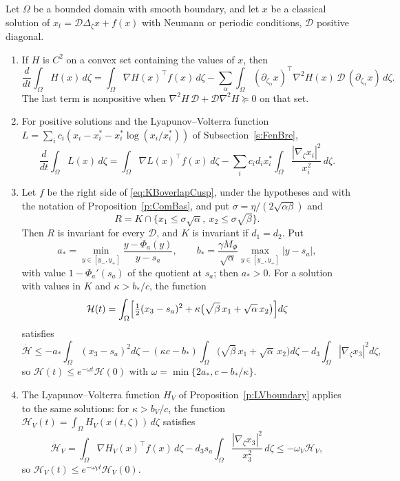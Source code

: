 Let $\Omega$ be a bounded domain with smooth boundary, and let $x$ be a classical solution of $x_t=\mathcal D\Delta_\zeta x+f(x)$ with Neumann or periodic conditions, $\mathcal D$ positive diagonal.
\begin{enumerate}
\item If $H$ is $C^2$ on a convex set containing the values of $x$, then
\[
 \frac{d}{dt}\int_\Omega H(x)\,d\zeta=\int_\Omega\nabla H(x)^\top f(x)\,d\zeta-\sum_\alpha\int_\Omega(\partial_{\zeta_\alpha}x)^\top\nabla^2H(x)\,\mathcal D\,(\partial_{\zeta_\alpha}x)\,d\zeta.
\]
The last term is nonpositive when $\nabla^2H\,\mathcal D+\mathcal D\nabla^2H\succeq0$ on that set.
\item For positive solutions and the Lyapunov--Volterra function $L=\sum_ic_i(x_i-x_i^*-x_i^*\log(x_i/x_i^*))$ of Subsection~\ref{s:FenBre},
\[
 \frac{d}{dt}\int_\Omega L(x)\,d\zeta=\int_\Omega\nabla L(x)^\top f(x)\,d\zeta-\sum_ic_id_ix_i^*\int_\Omega\frac{|\nabla_\zeta x_i|^2}{x_i^2}\,d\zeta.
\]
\item Let $f$ be the right side of \eqref{eq:KBoverlapCusp}, under the hypotheses and with the notation of Proposition~\ref{p:ComBas}, and put $\sigma=\eta/(2\sqrt{\alpha\beta})$ and
\[
 R=K\cap\{x_1\le\sigma\sqrt\alpha,\ x_2\le\sigma\sqrt\beta\}.
\]
Then $R$ is invariant for every $\mathcal D$, and $K$ is invariant if $d_1=d_2$. Put
\[
 a_*=\min_{y\in[y_-,y_+]}\frac{y-\Phi_a(y)}{y-s_a},\qquad
 b_*=\frac{\gamma M_\Phi}{\sqrt\alpha}\max_{y\in[y_-,y_+]}|y-s_a|,
\]
with value $1-\Phi_a'(s_a)$ of the quotient at $s_a$; then $a_*>0$. For a solution with values in $K$ and $\kappa>b_*/c$, the function
\[
 \mathcal H(t)=\int_\Omega\Bigl[\tfrac12(x_3-s_a)^2+\kappa\bigl(\sqrt\beta\,x_1+\sqrt\alpha\,x_2\bigr)\Bigr]d\zeta
\]
satisfies
\[
 \dot{\mathcal H}\le-a_*\int_\Omega(x_3-s_a)^2d\zeta-(\kappa c-b_*)\int_\Omega\bigl(\sqrt\beta\,x_1+\sqrt\alpha\,x_2\bigr)d\zeta-d_3\int_\Omega|\nabla_\zeta x_3|^2d\zeta,
\]
so $\mathcal H(t)\le e^{-\omega t}\mathcal H(0)$ with $\omega=\min\{2a_*,c-b_*/\kappa\}$.
\item The Lyapunov--Volterra function $H_V$ of Proposition~\ref{p:LVboundary} applies to the same solutions: for $\kappa>b_V/c$, the function $\mathcal H_V(t)=\int_\Omega H_V(x(t,\zeta))\,d\zeta$ satisfies
\[
 \dot{\mathcal H}_V=\int_\Omega\nabla H_V(x)^\top f(x)\,d\zeta-d_3s_a\int_\Omega\frac{|\nabla_\zeta x_3|^2}{x_3^2}\,d\zeta\le-\omega_V\mathcal H_V,
\]
so $\mathcal H_V(t)\le e^{-\omega_Vt}\mathcal H_V(0)$.
\end{enumerate}
\eeP

